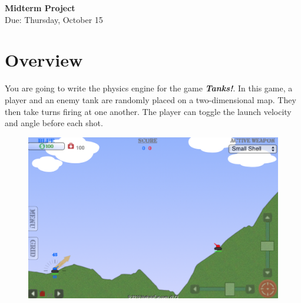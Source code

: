 \documentclass{article}
\begin{document}
\fancyfoot[C]{\thepage}
\vspace*{0cm}
\begin{center}
	{\LARGE \textbf{Midterm Project}}\\
	\vspace{0.25cm}
	{\Large Due: Thursday, October 15}
\end{center}

\section*{Overview}
You are going to write the physics engine for the game \textbf{\textit{Tanks!}}. In this game, a player and an enemy tank are randomly placed on a two-dimensional map. They then take turns firing at one another. The player can toggle the launch velocity and angle before each shot.

\begin{figure}[ht!]
	\centering
	\includegraphics[width=8 cm]{tanks.png}
\end{figure}
\end{document}
